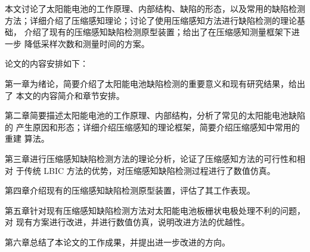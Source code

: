 本文讨论了太阳能电池的工作原理、内部结构、缺陷的形态，以及常用的缺陷检测
方法；详细介绍了压缩感知理论；讨论了使用压缩感知方法进行缺陷检测的理论基础，
介绍了现有的压缩感知缺陷检测原型装置；给出了在压缩感知测量框架下进一步
降低采样次数和测量时间的方案。

论文的内容安排如下：

第一章为绪论，简要介绍了太阳能电池缺陷检测的重要意义和现有研究结果，给出了
本文的内容简介和章节安排。

第二章简要描述太阳能电池的工作原理、内部结构，分析了常见的太阳能电池缺陷的
产生原因和形态；详细介绍压缩感知的理论框架，简要介绍压缩感知中常用的重建
算法。

第三章进行压缩感知缺陷检测方法的理论分析，论证了压缩感知方法的可行性和相对
于传统 LBIC 方法的优势，对压缩感知缺陷检测过程进行了数值仿真。

第四章介绍现有的压缩感知缺陷检测原型装置，评估了其工作表现。

第五章针对现有压缩感知缺陷检测方法对太阳能电池板栅状电极处理不利的问题，对
现有方案进行改进，并进行数值仿真，说明改进方法的优越性。

第六章总结了本论文的工作成果，并提出进一步改进的方向。
